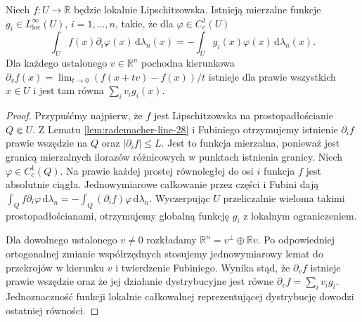 \begin{lemat}
\label{lem:rademacher-direction-28}
Niech $f:U\to\mathbb R$ będzie lokalnie Lipschitzowska.
Istnieją mierzalne funkcje $g_i\in L^\infty_{\mathrm{loc}}(U)$,
$i=1,\ldots,n$, takie, że dla $\varphi\in C_c^1(U)$
\[
 \int_U f(x)\partial_i\varphi(x)\,\mathrm d\lambda_n(x)
 =-\int_U g_i(x)\varphi(x)\,\mathrm d\lambda_n(x).
\]
Dla każdego ustalonego $v\in\mathbb R^n$ pochodna
kierunkowa $\partial_v f(x)=\lim_{t\to0}
(f(x+tv)-f(x))/t$ istnieje dla prawie wszystkich
$x\in U$ i jest tam równa $\sum_i v_i g_i(x)$.
\end{lemat}
\begin{proof}
Przypuśćmy najpierw, że $f$ jest Lipschitzowska na
prostopadłościanie $Q\Subset U$. Z Lematu
\ref{lem:rademacher-line-28} i Fubiniego otrzymujemy
istnienie $\partial_i f$ prawie wszędzie na $Q$ oraz
$|\partial_i f|\le L$. Jest to funkcja mierzalna,
ponieważ jest granicą mierzalnych ilorazów różnicowych
w punktach istnienia granicy. Niech $\varphi\in C_c^1(Q)$.
Na prawie każdej prostej równoległej do osi $i$ funkcja
$f$ jest absolutnie ciągła. Jednowymiarowe całkowanie
przez części i Fubini dają
$\int_Q f\partial_i\varphi\,\mathrm d\lambda_n
=-\int_Q (\partial_i f)\varphi\,\mathrm d\lambda_n$.
Wyczerpując $U$ przeliczalnie wieloma takimi
prostopadłościanami, otrzymujemy globalną funkcję
$g_i$ z lokalnym ograniczeniem.

Dla dowolnego ustalonego $v\ne0$ rozkładamy
$\mathbb R^n=v^\perp\oplus\mathbb Rv$.
Po odpowiedniej ortogonalnej zmianie współrzędnych
stosujemy jednowymiarowy lemat do przekrojów
w kierunku $v$ i twierdzenie Fubiniego.
Wynika stąd, że $\partial_v f$ istnieje prawie
wszędzie oraz że jej działanie dystrybucyjne jest
równe $\partial_v f=\sum_i v_i g_i$.
Jednoznaczność funkcji lokalnie całkowalnej
reprezentującej dystrybucję dowodzi ostatniej równości.
\end{proof}

